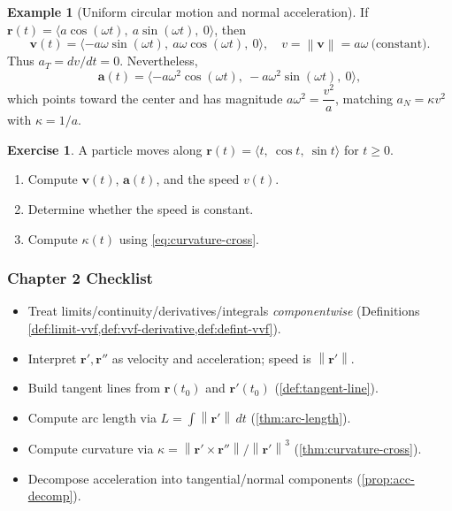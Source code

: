 \documentclass[12pt]{article}
\numberwithin{equation}{section}
\newcommand{\vect}[1]{\boldsymbol{#1}}   %
\newcommand{\norm}[1]{\left\lVert #1\right\rVert}
\theoremstyle{plain}
\theoremstyle{definition}
\newtheorem{example}[theorem]{Example}
\newtheorem{exercise}[theorem]{Exercise}
\theoremstyle{remark}
\begin{document}
\begin{example}[Uniform circular motion and normal acceleration]
If $\vect r(t)=\langle a\cos(\omega t),\ a\sin(\omega t),\ 0\rangle$, then
\[
\vect v(t)=\langle -a\omega\sin(\omega t),\ a\omega\cos(\omega t),\ 0\rangle,\quad
v=\norm{\vect v}=a\omega \ \text{(constant)}.
\]
Thus $a_T=dv/dt=0$. Nevertheless,
\[
\vect a(t)=\langle -a\omega^2\cos(\omega t),\ -a\omega^2\sin(\omega t),\ 0\rangle,
\]
which points toward the center and has magnitude $a\omega^2=\dfrac{v^2}{a}$, matching $a_N=\kappa v^2$ with $\kappa=1/a$.
\end{example}

\begin{exercise}
A particle moves along $\vect r(t)=\langle t,\ \cos t,\ \sin t\rangle$ for $t\ge 0$.
\begin{enumerate}[label=(\alph*)]
\item Compute $\vect v(t)$, $\vect a(t)$, and the speed $v(t)$.
\item Determine whether the speed is constant.
\item Compute $\kappa(t)$ using \cref{eq:curvature-cross}.
\end{enumerate}
\end{exercise}

\subsubsection*{Chapter 2 Checklist}
\begin{itemize}
\item Treat limits/continuity/derivatives/integrals \emph{componentwise} (Definitions \cref{def:limit-vvf,def:vvf-derivative,def:defint-vvf}).
\item Interpret $\vect r',\vect r''$ as velocity and acceleration; speed is $\norm{\vect r'}$.
\item Build tangent lines from $\vect r(t_0)$ and $\vect r'(t_0)$ (\cref{def:tangent-line}).
\item Compute arc length via $L=\int \norm{\vect r'}\,dt$ (\cref{thm:arc-length}).
\item Compute curvature via $\kappa=\norm{\vect r'\times \vect r''}/\norm{\vect r'}^3$ (\cref{thm:curvature-cross}).
\item Decompose acceleration into tangential/normal components (\cref{prop:acc-decomp}).
\end{itemize}

\end{document}
